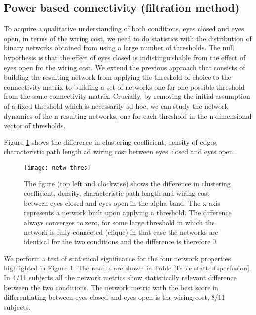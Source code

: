 \documentclass[11pt, onecolumn]{article}
\begin{document}
\subsection{Power based connectivity (filtration method)}
\label{ss:perfusion}
To acquire a qualitative understanding of both conditions, eyes closed and eyes open, in terms of the wiring cost, we need to do statistics with the distribution of binary networks obtained from using a large number of thresholds.
The null hypothesis is that the effect of eyes closed is indistinguishable from the effect of eyes open for the wiring cost. We extend the previous approach that consists of building the resulting  network from applying the threshold of choice to the connectivity matrix to building a set of networks one for one possible threshold from the same connectivity matrix. Crucially, by removing the initial assumption of a fixed threshold which is necessarily ad hoc, we can study the network dynamics of the n resulting networks, one for each threshold in the n-dimensional vector of thresholds.

Figure \ref{fig:netw-thres} shows the difference in clustering coefficient, density of edges, characteristic path length ad wiring cost between eyes closed and eyes open.

\begin{figure}[H]
        \centering
        \texttt{[image: netw-thres]}
        \caption{The figure (top left and clockwise) shows the difference in clustering coefficient, density, characteristic path length and wiring cost between eyes closed and eyes open in the alpha band. The x-axis represents a network built upon applying a threshold. The difference always converges to zero, for some large threshold in which the network is fully connected (clique) in that case the networks are identical for the two conditions and the difference is therefore 0. }
\label{fig:netw-thres}
\end{figure}

We perform a test of statistical significance for the four network properties highlighted in Figure \ref{fig:netw-thres}. The results are shown in Table \ref{Table:stattestsperfusion}. In 4/11 subjects all the network metrics show statistically relevant difference between the two conditions. The network metric with the best score in differentiating between eyes closed and eyes open is the wiring cost, 8/11 subjects.
\end{document}
